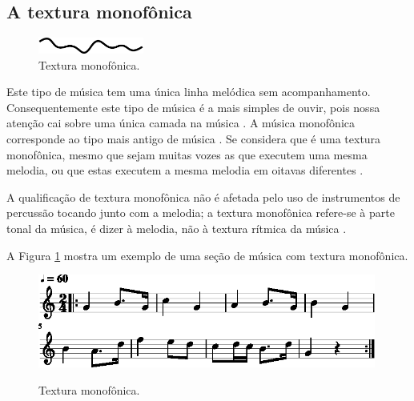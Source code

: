 \subsection{A textura monofônica}
\label{subsec:monofonica}
\begin{figure}
\centering
    \vspace{-10pt}
    \includegraphics[width=0.31\textwidth]{chapters/cap-musicalidade-percepcion/monofonica1.eps}
  \caption{Textura monofônica.}
\end{figure}
Este tipo de música tem uma única linha melódica sem acompanhamento.
Consequentemente este tipo de música é a mais simples de ouvir, 
pois nossa atenção cai sobre uma única camada na música \cite[pp. 77]{copland1974ouvir} \cite[pp. 29]{kerman2015listen}.
A música monofônica corresponde ao tipo mais antigo de música \cite[pp. 539]{apel1969harvard}.
Se considera que é uma textura monofônica, mesmo que sejam muitas vozes as que executem uma mesma melodia, 
ou que estas executem a mesma melodia em oitavas diferentes \cite[pp. 42]{bennett1993elementos} \cite[pp. 58]{holland2013music}.

A qualificação de textura  monofônica não é afetada pelo uso de instrumentos de percussão tocando junto com a melodia;
a textura monofônica refere-se à parte tonal da música, é dizer à melodia, 
não à textura rítmica da música \cite[pp. 58]{holland2013music}.

\begin{example}
A Figura \ref{fig:ex:monofonica} mostra um exemplo de uma seção de música com textura monofônica.
\end{example}

\begin{figure}[!h]
\centering
    \href{https://drive.google.com/file/d/1o2xCKp2U40Yl28d-GyAbq_llg13Uv5sz/view?usp=sharing}{\includegraphics[width=0.99\textwidth]{chapters/cap-musicalidade-percepcion/textura-monofonica-1.eps}}
  \caption{Textura monofônica.}
\label{fig:ex:monofonica}
\end{figure}
 
